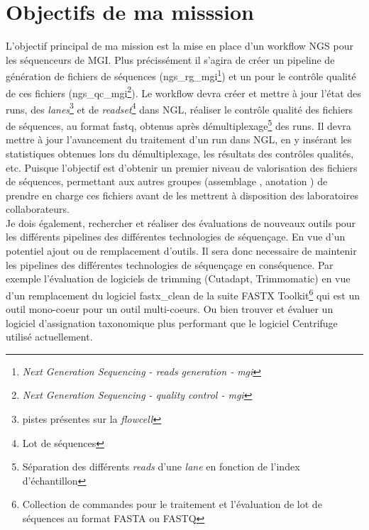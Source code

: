 \section{Objectifs de ma misssion}
L'objectif principal de ma mission est la mise en place d'un workflow NGS pour les séquenceurs de MGI. Plus précissément il s'agira de créer un pipeline de génération de fichiers de séquences (ngs\_rg\_mgi\footnote{\emph{Next Generation Sequencing - reads generation - mgi}}) et un pour le contrôle qualité de ces fichiers (ngs\_qc\_mgi\footnote{\emph{Next Generation Sequencing - quality control - mgi}}). Le workflow devra créer et mettre à jour l'état des runs, des \emph{lanes}\footnote{pistes présentes sur la \emph{flowcell}} et de \emph{readset}\footnote{Lot de séquences} dans NGL, réaliser le contrôle qualité des fichiers de séquences, au format fastq, obtenus après démultiplexage\footnote{Séparation des différents \emph{reads} d'une \emph{lane} en fonction de l'index d'échantillon} des runs. Il devra mettre à jour l'avancement du traitement d'un run dans NGL, en y insérant les statistiques obtenues lors du démultiplexage, les résultats des contrôles qualités, etc. Puisque l'objectif est d'obtenir un premier niveau de valorisation des fichiers de séquences, permettant aux autres groupes (\og assemblage \fg{}, \og anotation \fg{}) de prendre en charge ces fichiers avant de les mettrent à disposition des laboratoires collaborateurs.\\

Je dois également, rechercher et réaliser des évaluations de nouveaux outils pour les différents pipelines des différentes technologies de séquençage. En vue d'un potentiel ajout ou de remplacement d'outils. Il sera donc necessaire de maintenir les pipelines des différentes technologies de séquençage en conséquence. Par exemple l'évaluation de logiciels de trimming (Cutadapt, Trimmomatic) en vue d'un remplacement du logiciel fastx_clean de la suite FASTX Toolkit\footnote{Collection de commandes pour le traitement et l'évaluation de lot de séquences au format FASTA ou FASTQ} qui est un outil mono-coeur pour un outil multi-coeurs. Ou bien trouver et évaluer un logiciel d'assignation taxonomique plus performant que le logiciel Centrifuge utilisé actuellement.